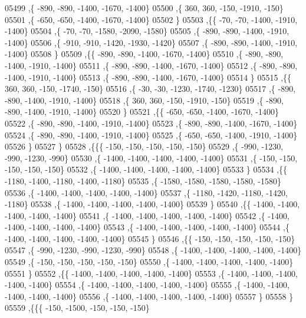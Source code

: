 \begin{DoxyCode}
05499     ,\{  -890,  -890, -1400, -1670, -1400\}
05500     ,\{   360,   360,  -150, -1910,  -150\}
05501     ,\{  -650,  -650, -1400, -1670, -1400\}
05502     \}
05503    ,\{\{   -70,   -70, -1400, -1910, -1400\}
05504     ,\{   -70,   -70, -1580, -2090, -1580\}
05505     ,\{  -890,  -890, -1400, -1910, -1400\}
05506     ,\{  -910,  -910, -1420, -1930, -1420\}
05507     ,\{  -890,  -890, -1400, -1910, -1400\}
05508     \}
05509    ,\{\{  -890,  -890, -1400, -1670, -1400\}
05510     ,\{  -890,  -890, -1400, -1910, -1400\}
05511     ,\{  -890,  -890, -1400, -1670, -1400\}
05512     ,\{  -890,  -890, -1400, -1910, -1400\}
05513     ,\{  -890,  -890, -1400, -1670, -1400\}
05514     \}
05515    ,\{\{   360,   360,  -150, -1740,  -150\}
05516     ,\{   -30,   -30, -1230, -1740, -1230\}
05517     ,\{  -890,  -890, -1400, -1910, -1400\}
05518     ,\{   360,   360,  -150, -1910,  -150\}
05519     ,\{  -890,  -890, -1400, -1910, -1400\}
05520     \}
05521    ,\{\{  -650,  -650, -1400, -1670, -1400\}
05522     ,\{  -890,  -890, -1400, -1910, -1400\}
05523     ,\{  -890,  -890, -1400, -1670, -1400\}
05524     ,\{  -890,  -890, -1400, -1910, -1400\}
05525     ,\{  -650,  -650, -1400, -1910, -1400\}
05526     \}
05527    \}
05528   ,\{\{\{  -150,  -150,  -150,  -150,  -150\}
05529     ,\{  -990, -1230,  -990, -1230,  -990\}
05530     ,\{ -1400, -1400, -1400, -1400, -1400\}
05531     ,\{  -150,  -150,  -150,  -150,  -150\}
05532     ,\{ -1400, -1400, -1400, -1400, -1400\}
05533     \}
05534    ,\{\{ -1180, -1400, -1180, -1400, -1180\}
05535     ,\{ -1580, -1580, -1580, -1580, -1580\}
05536     ,\{ -1400, -1400, -1400, -1400, -1400\}
05537     ,\{ -1180, -1420, -1180, -1420, -1180\}
05538     ,\{ -1400, -1400, -1400, -1400, -1400\}
05539     \}
05540    ,\{\{ -1400, -1400, -1400, -1400, -1400\}
05541     ,\{ -1400, -1400, -1400, -1400, -1400\}
05542     ,\{ -1400, -1400, -1400, -1400, -1400\}
05543     ,\{ -1400, -1400, -1400, -1400, -1400\}
05544     ,\{ -1400, -1400, -1400, -1400, -1400\}
05545     \}
05546    ,\{\{  -150,  -150,  -150,  -150,  -150\}
05547     ,\{  -990, -1230,  -990, -1230,  -990\}
05548     ,\{ -1400, -1400, -1400, -1400, -1400\}
05549     ,\{  -150,  -150,  -150,  -150,  -150\}
05550     ,\{ -1400, -1400, -1400, -1400, -1400\}
05551     \}
05552    ,\{\{ -1400, -1400, -1400, -1400, -1400\}
05553     ,\{ -1400, -1400, -1400, -1400, -1400\}
05554     ,\{ -1400, -1400, -1400, -1400, -1400\}
05555     ,\{ -1400, -1400, -1400, -1400, -1400\}
05556     ,\{ -1400, -1400, -1400, -1400, -1400\}
05557     \}
05558    \}
05559   ,\{\{\{  -150, -1500,  -150,  -150,  -150\}

\end{DoxyCode}
